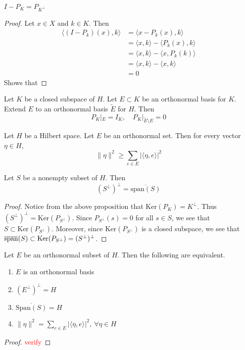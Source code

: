 
\begin{proposition}
  $I-P_K = P_{K^\perp}$
\end{proposition}
\begin{proof}
  Let $x \in X$ and $k \in K$. Then
  \begin{align*}
    \langle (I - P_k)(x), k \rangle &= \langle  x - P_k(x) , k \rangle \\
    &= \langle  x , k \rangle - \langle P_k(x) ,  k \rangle  \\
    &= \langle x , k \rangle  - \langle x , P_k(k) \rangle \\
    &= \langle x , k \rangle  - \langle  x , k \rangle  \\
    &= 0
  \end{align*}
  Shows that
\end{proof}

\begin{proposition}
  Let $K$ be a closed subspace of $H$. Let $E \subset K$ be an orthonormal basis
  for $K$. Extend $E$ to an orthonormal basis $\tilde{E}$ for $H$. Then \[
    P_K|_E = I_K, \quad P_K|_{\tilde{E} \setminus E} = 0
  \]
\end{proposition}

\begin{remark}
  Let $H$ be a Hilbert space. Let $E$ be an orthonormal set. Then for
  every vector $\eta \in H$, \[
    \|\eta\|^2 \ge \sum_{e \in E} |\langle \eta ,  e \rangle |^2
  \]
\end{remark}

\begin{lemma}
  Let $S$ be a nonempty subset of $H$. Then \[
    (S^\perp)^\perp  = \overline{\textrm{span}(S)}
  \]
\end{lemma}
\begin{proof}
  Notice from the above proposition that $\textrm{Ker}(P_K) =
  K^\perp$. Thus $(S^\perp)^\perp = \textrm{Ker}(P_{S^\perp})$. Since
  $P_{S^\perp}(s) = 0$ for all $s \in S$, we see that $S \subset
  \textrm{Ker}(P_{S^\perp})$. Moreover, since
  $\textrm{Ker}(P_{S^\perp})$ is a closed subspace, we see that
  $\overline{ \textrm{\textrm{span}}}(S) \subset
  \textrm{Ker}(P_{S^\perp}) = ( S^\perp)^\perp$.
\end{proof}

\begin{corollary}
  Let $E$ be an orthonormal subset of $H$. Then the following are equivalent.
  \begin{enumerate}[label=(\arabic*)]
    \item $E$ is an orthonormal basis
    \item $(E^\perp)^\perp = H$
    \item $\overline{\textrm{Span}(S)} = H$
    \item $\|\eta\|^2 = \sum_{e \in E} |\langle \eta ,  e \rangle
      |^2, \ \forall \eta \in H$
  \end{enumerate}
\end{corollary}
\begin{proof}
  \textcolor{red}{verify}
\end{proof}

